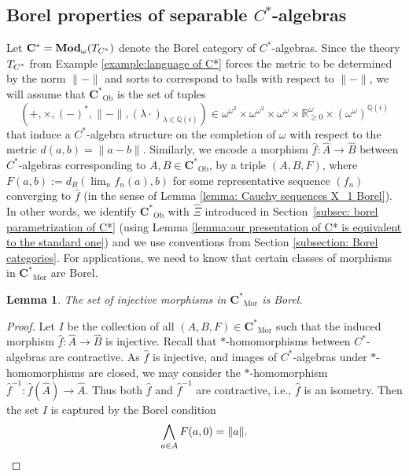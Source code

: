 \documentclass[12pt]{amsart}
\newtheorem{lemma}[theorem]{Lemma}
\DeclareMathOperator{\bfMod}{\bf{Mod}}
\DeclareMathOperator{\Mor}{Mor}
\DeclareMathOperator{\Ob}{Ob}
\newcommand{\Cstar}{\mathbf{C^*}} %
\DeclarePairedDelimiter{\norm}{\lVert}{\rVert}
\begin{document}
\subsection{Borel properties of separable $C^*$-algebras}\label{section:Borel_properties_of_C_star_alg}

Let $\Cstar = \bfMod_\omega(T_{C^*})$ denote the Borel category of $C^*$-algebras. Since the theory $T_{\textnormal{$C^*$}}$ from Example \ref{example:language of C*} forces the metric to be determined by the norm $\|-\|$ and sorts to correspond to balls with respect to $\|-\|$, we will assume that $\Cstar_{\Ob}$ is the set of tuples
\[ (+,\times,(-)^{*}, \|-\|, (\lambda \cdot)_{\lambda \in \mathbb{Q}(i)}) \in  \omega^{\omega^2} \times \omega^{\omega^2} \times \omega^{\omega} \times \mathbb{R}_{\geq 0}^{\omega} \times (\omega^{\omega})^{\mathbb{Q}(i)}\]
that induce a $C^*$-algebra structure on the completion of $\omega$ with respect to the metric $d(a,b) = \|a-b\|$. 
Similarly, we encode a morphism $\widehat{f} \colon \widehat{A} \rightarrow \widehat{B}$ between $C^*$-algebras corresponding to $A, B \in \Cstar_{\Ob}$, by a triple $(A, B, F)$, where $F(a,b) := d_B(\lim_n f_n(a), b)$ for some representative sequence $(f_n)$ converging to $\widehat{f}$ (in the sense of Lemma \ref{lemma: Cauchy sequences X_1 Borel}).
In other words, we identify $\Cstar_{\Ob}$ with $\hat{\Xi}$ introduced in Section~\ref{subsec: borel parametrization of C*} (using Lemma \ref{lemma:our presentation of C* is equivalent to the standard one}) and we use conventions from Section \ref{subsection: Borel categories}. For applications, we need to know that certain classes of morphisms in $\Cstar_{\Mor}$ are Borel.
\begin{lemma} \label{lem: injective Borel}
    The set of injective morphisms in $\Cstar_{\Mor}$ is Borel. 
\end{lemma}
\begin{proof}
    Let $I$ be the collection of all $(A, B, F) \in \Cstar_{\Mor}$ such that the induced morphism $\widehat{f} \colon \widehat{A} \to \widehat{B}$ is injective.
    Recall that $*$-homomorphisms between $C^*$-algebras are contractive. As $\widehat{f}$ is injective, and images of $C^*$-algebras under $*$-homomorphisms are closed, we may consider the $*$-homomorphism $\widehat{f}^{-1} \colon \widehat{f}(\widehat{A}) \rightarrow \widehat{A}$. Thus both $\widehat{f}$ and $\widehat{f}^{-1}$ are contractive, i.e., $\widehat{f}$ is an isometry. Then the set $I$ is captured by the Borel condition
    \[  
        \bigwedge_{a \in A} F(a,0) = \norm{a}.   \qedhere
    \]
\end{proof}
\end{document}
